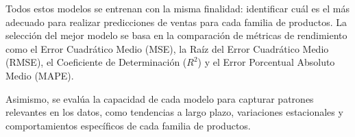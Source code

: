 Todos estos modelos se entrenan con la misma finalidad: identificar cuál es el más adecuado para realizar predicciones de ventas para cada familia de productos. La selección del mejor modelo se basa en la comparación de métricas de rendimiento como el Error Cuadrático Medio (MSE), la Raíz del Error Cuadrático Medio (RMSE), el Coeficiente de Determinación ($R^2$) y el Error Porcentual Absoluto Medio (MAPE).

Asimismo, se evalúa la capacidad de cada modelo para capturar patrones relevantes en los datos, como tendencias a largo plazo, variaciones estacionales y comportamientos específicos de cada familia de productos.



	
